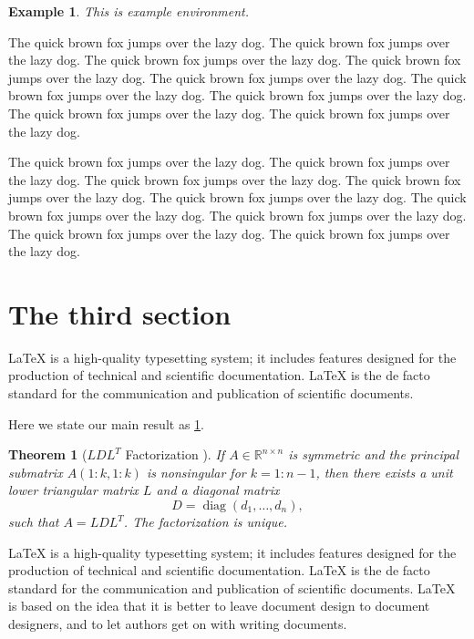 \documentclass[openany,twoside,12pt]{book}
\theoremstyle{plain}
\newtheorem{theorem}{Theorem}[chapter]
\newtheorem{example}{Example}[chapter]
\numberwithin{equation}{chapter}
\numberwithin{figure}{chapter}
\numberwithin{table}{chapter}
\begin{document}
\begin{example}
  This is example environment.
\end{example}

The quick brown fox jumps over the lazy dog. The quick brown fox jumps over the lazy dog. The quick brown fox jumps over the lazy dog. The quick brown fox jumps over the lazy dog. The quick brown fox jumps over the lazy dog. The quick brown fox jumps over the lazy dog. The quick brown fox jumps over the lazy dog. The quick brown fox jumps over the lazy dog. The quick brown fox jumps over the lazy dog.

The quick brown fox jumps over the lazy dog. The quick brown fox jumps over the lazy dog. The quick brown fox jumps over the lazy dog. The quick brown fox jumps over the lazy dog. The quick brown fox jumps over the lazy dog. The quick brown fox jumps over the lazy dog. The quick brown fox jumps over the lazy dog. The quick brown fox jumps over the lazy dog. The quick brown fox jumps over the lazy dog.

\section{The third section}
LaTeX is a high-quality typesetting system; it includes features designed for the production of technical and scientific documentation. LaTeX is the de facto standard for the communication and publication of scientific documents.

Here we state our main result as \ref{thm:bigthm}.

\begin{theorem}[$LDL^T$ Factorization \cite{Adams2003}]\label{thm:bigthm}
  If $A \in \mathbb{R}^{n \times n}$ is symmetric and the principal
  submatrix $A(1:k,1:k)$ is nonsingular for $k=1:n-1$, then there
  exists a unit lower triangular matrix $L$ and a diagonal matrix
  \begin{equation*}
    D = \operatorname{diag}(d_1,\dots,d_n),  %
  \end{equation*}
  such that $A=LDL^T$. The factorization is unique.
\end{theorem}

LaTeX is a high-quality typesetting system; it includes features designed
for the production of technical and scientific documentation.
LaTeX is the de facto standard for the communication and publication of scientific documents.
LaTeX is based on the idea that it is better to leave document design to
document designers, and to let authors get on with writing documents.
\end{document}
